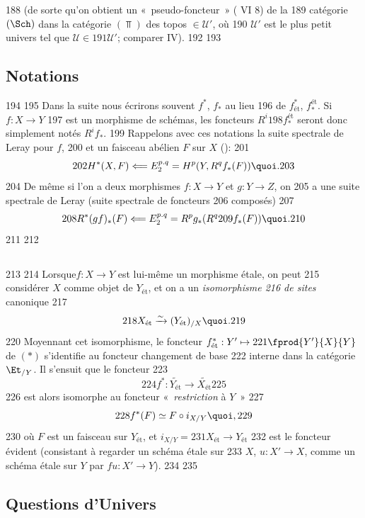    188	(de sorte qu'on obtient un « pseudo-foncteur » ( VI 8) de la
   189	catégorie $(\Sch)$ dans la catégorie $(\Top)$ des topos $\in 𝒰'$, où
   190	$𝒰'$ est le plus petit univers tel que $𝒰 \in
   191	𝒰'$; comparer IV).
   192	
   193	\subsection{Notations}
   194	
   195	Dans la suite nous écrirons souvent $f^{\ast}$, $f_{\ast}$ au lieu
   196	de $f^{\ast}_{\text{ét}}$, $f^{\text{ét}}_{\ast}$. Si $f : X \to Y$
   197	est un morphisme de schémas, les foncteurs $R^{i}
   198	f_{\ast}^{\text{ét}}$ seront donc simplement notés $R^{i} f_{\ast}$.
   199	Rappelons avec ces notations la suite spectrale de Leray pour $f$,
   200	et un faisceau abélien $F$ sur $X$ ():
   201	$$
   202	H^{\ast} (X, F) \Longleftarrow E^{p. q}_2 = H^{p}(Y, R^q f_\ast (F)){\quoi}.
   203	$$
   204	De même si l'on a deux morphismes $f : X \to Y$ et $g : Y \to Z$, on
   205	a une suite spectrale de Leray (suite spectrale de foncteurs
   206	composés)
   207	$$
   208	R^{\ast} (gf)_{\ast} (F) \Longleftarrow E^{p. q}_2 = R^{p} g_{\ast} (R^q
   209	f_\ast (F)){\quoi}.
   210	$$
   211	
   212	\subsection{}
   213	
   214	Lorsque\pageoriginale $f : X \to Y$ est lui-même un morphisme étale, on peut
   215	considérer $X$ comme objet de $Y_{\text{ét}}$, et on a un \emph{isomorphisme
   216	  de sites} canonique
   217	$$
   218	X_{\text{ét}} \xrightarrow{\sim} (Y_{\text{ét}})_{/X}{\quoi}.
   219	$$
   220	Moyennant cet isomorphisme, le foncteur $f^{\ast}_{\text{ét}} : Y'\mapsto
   221	\fprod{Y'}{X}{Y}$ de $(\ast)$ s'identifie au foncteur changement de base
   222	interne dans la catégorie $\Et_{/Y}$. Il s'ensuit que le foncteur
   223	$$
   224	f^{\ast} : \widetilde{Y_{\text{ét}}} \to \widetilde{X_{\text{ét}}}
   225	$$
   226	est alors isomorphe au foncteur « \emph{restriction} à $Y$ »
   227	$$
   228	f^{\ast} (F) \simeq F \circ i_{X/Y}{\quoi},
   229	$$
   230	où $F$ est un faisceau sur $Y_{\text{ét}}$, et $i_{X/Y} =
   231	X_{\text{ét}} \to Y_{\text{ét}}$
   232	est le foncteur évident (consistant à regarder un schéma étale sur
   233	$X$, $u : X'\to X$, comme un schéma étale sur $Y$ par $fu : X'\to Y$).
   234	
   235	\subsection{Questions d'Univers}
